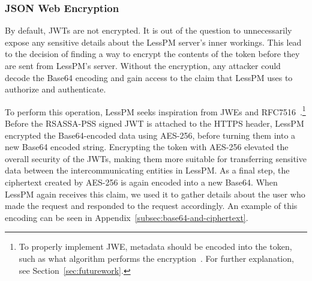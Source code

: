 \subsubsection{JSON Web Encryption}
By default, JWTs are not encrypted.
It is out of the question to unnecessarily expose any sensitive details about
the LessPM server's inner workings.
This lead to the decision of finding a way to encrypt the contents of the 
token before they are sent from LessPM's server.
Without the encryption, any attacker could decode the Base64 encoding and
gain access to the claim that LessPM uses to authorize and authenticate.

To perform this operation, LessPM seeks inspiration from JWEs and
RFC7516~\cite{rfc7516}.\footnote{
  To properly implement JWE, metadata should be encoded into the token, such as
  what algorithm performs the encryption~\cite{rfc7516}. For further
  explanation, see Section~\ref{sec:futurework}.
}
Before the RSASSA-PSS signed JWT is attached to the HTTPS header,
LessPM encrypted the Base64-encoded data using AES-256, before turning them into
a new Base64 encoded string.
Encrypting the token with AES-256 elevated the overall security of the
JWTs, making them more suitable for transferring sensitive data between the
intercommunicating entities in LessPM\@.
As a final step, the ciphertext created by AES-256 is again encoded into a
new Base64.
When LessPM again receives this claim, we used it to gather details about the
user who made the request and responded to the request accordingly.
An example of this encoding can be seen in
Appendix~\ref{subsec:base64-and-ciphertext}.

